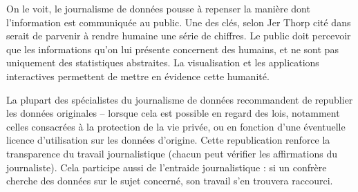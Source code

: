 On le voit, le journalisme de données pousse à repenser la manière dont l'information 
est communiquée au public. Une des clés, selon Jer Thorp cité dans \cite{handbookfr} 
serait de parvenir à rendre \og humaine \fg une série de chiffres. Le public doit 
percevoir que les informations qu'on lui présente concernent des humains, et ne sont 
pas uniquement des statistiques abstraites. La visualisation et les applications 
interactives permettent de mettre en évidence cette humanité. 

La plupart des spécialistes du journalisme de données recommandent de republier les
données originales -- lorsque cela est possible en regard des lois, notamment celles 
consacrées à la protection de la vie privée, ou en fonction d'une éventuelle licence
d'utilisation sur les données d'origine. Cette republication renforce la transparence
du travail journalistique (chacun peut vérifier les affirmations du journaliste).
Cela participe aussi de l'entraide journalistique : si un confrère cherche des données
sur le sujet concerné, son travail s'en trouvera raccourci.

